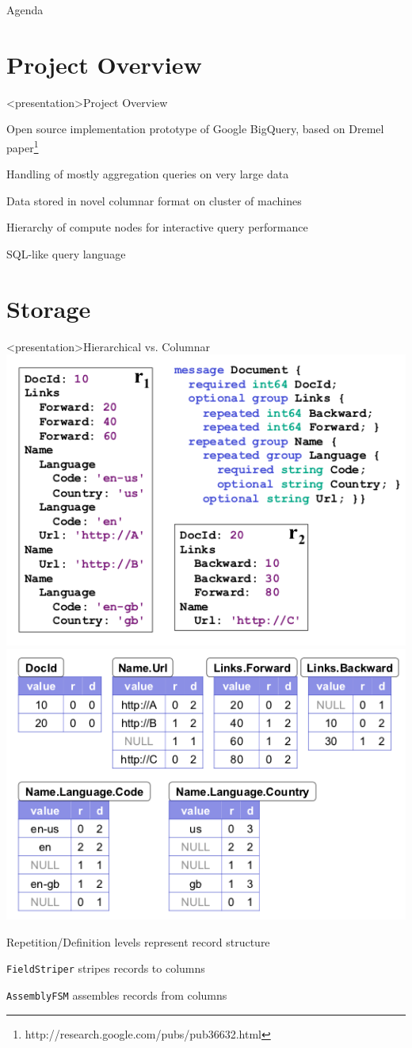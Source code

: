 \begin{frame}[t,plain]
\titlepage
\end{frame}

\begin{frame}[t,plain]{Agenda}
\tableofcontents
\end{frame}

\section{Project Overview}

\begin{frame}<presentation>{Project Overview}
\begin{niitemize}
 \item Open source implementation prototype of Google BigQuery, based on Dremel
   paper\footnote{http://research.google.com/pubs/pub36632.html}
 \item Handling of mostly aggregation queries on very large data
 \item Data stored in novel columnar format on cluster of machines
 \item Hierarchy of compute nodes for interactive query performance
 \item SQL-like query language
\end{niitemize}
\end{frame}

\section{Storage}

\begin{frame}<presentation>{Hierarchical vs. Columnar}
\includegraphics[width=.49\textwidth]{gfx/hierarchical-schema}
\hfill
\includegraphics[width=.5\textwidth]{gfx/columnar}

\begin{niitemize}
 \item Repetition/Definition levels represent record structure
 \item \texttt{FieldStriper} stripes records to columns
 \item \texttt{AssemblyFSM} assembles records from columns
\end{niitemize}
\end{frame}


